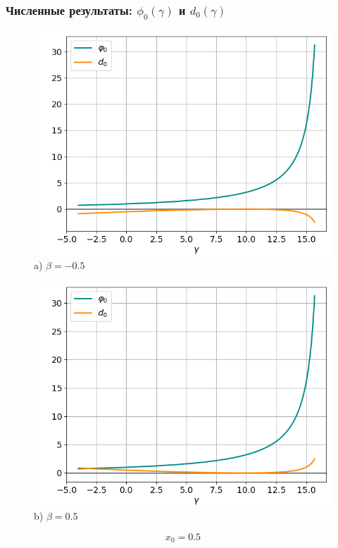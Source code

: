 \documentclass[fullscreen=true, unicode, bookmarks=false]{beamer}
\begin{document}
\begin{frame}
\frametitle{ Численные результаты: $ \phi_0(\gamma) $ и $ d_0(\gamma) $ }

\begin{figure} 
\begin{minipage}[h]{0.49\linewidth}
\begin{center}
\includegraphics[scale=0.34]{divergent_phi0d0_x0=0,5,beta=-0,5.png} \\ {\scriptsize a) $ \beta = -0.5 $}
\end{center}
\end{minipage} 
\hfill
\begin{minipage}[h]{0.49\linewidth}
\begin{center}
\includegraphics[scale=0.34]{divergent_phi0d0_x0=0,5,beta=0,5.png}  \\ {\scriptsize b) $ \beta = 0.5 $}
\end{center}
\end{minipage} 
\end{figure}

$$ x_0 = 0.5 $$

\end{frame}
\end{document}
